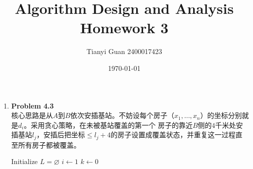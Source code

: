 \documentclass{ctexart}
\title{\vspace*{-1cm}Algorithm Design and Analysis Homework 3}
\author{Tianyi Guan 2400017423}
\date{\today}
\begin{document}
\maketitle

\begin{enumerate}[label=\arabic*.]
    \item \textbf{Problem 4.3}\\
        核心思路是从$A$到$B$依次安插基站。不妨设每个房子（$x_1,\dots, x_n$）的坐标分别就是$d_i$。采用贪心策略，在未被基站覆盖的第一个
        房子的靠近$B$侧的$4$千米处安插基站$l_j$，安插后把坐标$\le l_j+4$的房子设置成覆盖状态，并重复这一过程直至所有房子都被覆盖。\\
        \begin{algorithm}[H]
            \caption{贪心法求解基站覆盖问题}
            Initialize $L=\varnothing$\;
            $i \leftarrow 1$\;
            $k \leftarrow 0$\;
\end{algorithm}
\end{enumerate}
\end{document}
